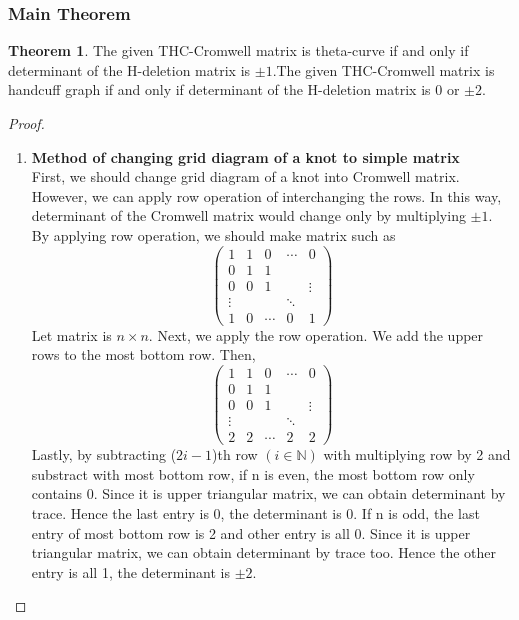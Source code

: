 \documentclass{article}
\theoremstyle{definition}
\theoremstyle{theorem}
\newtheorem{theorem}{Theorem}
\theoremstyle{proposition}
\theoremstyle{corollary}
\begin{document}
\subsubsection{Main Theorem}
\begin{theorem}The given THC-Cromwell matrix is theta-curve if and only if determinant of the H-deletion matrix is $\pm 1$.The given THC-Cromwell matrix is handcuff graph if and only if determinant of the H-deletion matrix is 0 or $\pm 2$.
\end{theorem}

\begin{proof}
\begin{enumerate}
    \item \textbf{Method of changing grid diagram of a knot to simple matrix}\\
    First, we should change grid diagram of a knot into Cromwell matrix. However, we can apply row operation of interchanging the rows. In this way, determinant of the Cromwell matrix would change only by multiplying $\pm 1$.\\
By applying row operation, we should make matrix such as
    $$\begin{pmatrix} 
    1 & 1 & 0 & \cdots & 0\\
    0 & 1 & 1 &  &  \\
    0 & 0 & 1 & & \vdots\\ 
    \vdots & & & \ddots & \\
    1 & 0 & \cdots & 0 & 1
    \end{pmatrix}$$
Let matrix is $n\times n$.
Next, we apply the row operation. We add the upper rows to the most bottom row. Then,
    $$\begin{pmatrix} 
    1 & 1 & 0 & \cdots & 0\\
    0 & 1 & 1 &  &  \\
    0 & 0 & 1 & & \vdots\\ 
    \vdots & & & \ddots & \\
    2 & 2 & \cdots & 2 & 2
    \end{pmatrix}$$
Lastly, by subtracting ($2i-1$)th row $(i \in \mathbb{N})$ with multiplying row by 2 and substract with most bottom row, if n is even, the most bottom row only contains 0. Since it is upper triangular matrix, we can obtain determinant by trace. Hence the last entry is 0, the determinant is 0. If n is odd, the last entry of most bottom row is 2 and other entry is all 0. Since it is upper triangular matrix, we can obtain determinant by trace too. Hence the other entry is all 1, the determinant is $\pm 2$.\\


\end{enumerate}
\end{proof}
\end{document}
